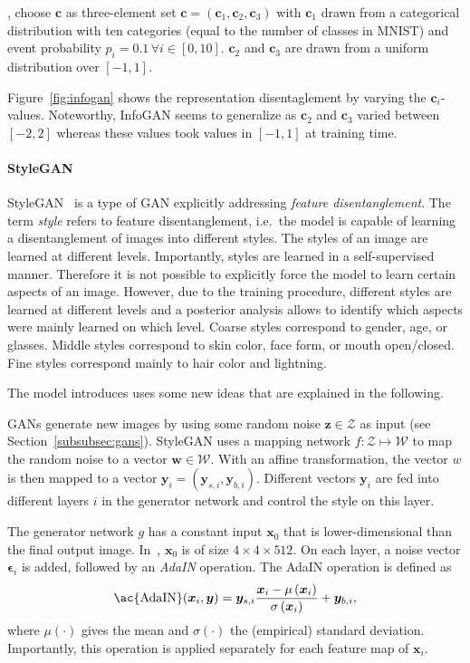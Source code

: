 , \citet{chen2016infogan} choose $\bm{c}$ as three-element set $\bm{c} = (\bm{c}_1, \bm{c}_2, \bm{c}_3)$ with $\bm{c}_1$ drawn from a categorical distribution with ten categories (equal to the number of classes in MNIST) and event probability $p_i=0.1 \, \forall i \in [0, 10]$.
$\bm{c}_2$ and $\bm{c}_3$ are drawn from a uniform distribution over $[-1, 1]$.

Figure~\ref{fig:infogan} shows the representation disentaglement by varying the $\bm{c}_i$-values.
Noteworthy, InfoGAN seems to generalize as $\bm{c}_2$ and $\bm{c}_3$ varied between $[-2, 2]$ whereas these values took values in $[-1, 1]$ at training time.

\paragraph{StyleGAN}
StyleGAN~\citep{karras2019style} is a type of \ac{GAN} explicitly addressing \textit{feature disentanglement}.
The term \textit{style} refers to feature disentanglement, i.e.~the model is capable of learning a disentanglement of images into different styles.
The styles of an image are learned at different levels.
Importantly, styles are learned in a self-supervised manner.
Therefore it is not possible to explicitly force the model to learn certain aspects of an image.
However, due to the training procedure, different styles are learned at different levels and a posterior analysis allows to identify which aspects were mainly learned on which level.
Coarse styles correspond to gender, age, or glasses.
Middle styles correspond to skin color, face form, or mouth open/closed.
Fine styles correspond mainly to hair color and lightning.

The model introduces uses some new ideas that are explained in the following.

\acp{GAN} generate new images by using some random noise $\bm{z}\in \mathcal{Z}$ as input (see Section~\ref{subsubsec:gans}).
StyleGAN uses a mapping network $f: \mathcal{Z}\mapsto \mathcal{W}$ to map the random noise to a vector $\bm{w}\in \mathcal{W}$.
With an affine transformation, the vector $w$ is then mapped to a vector $\bm{y}_i = (\bm{y}_{s,i}, \bm{y}_{b,i})$.
Different vectors $\bm{y}_i$ are fed into different layers $i$ in the generator network and control the style on this layer.

The generator network $g$ has a constant input $\bm{x}_0$ that is lower-dimensional than the final output image.
In~\citet{karras2019style}, $\bm{x}_0$ is of size $4\times 4\times 512$.
On each layer, a noise vector $\bm{\epsilon}_i$ is added, followed by an \textit{\acf{AdaIN}} operation.
The \ac{AdaIN} operation is defined as
\begin{align}
    \text{\ac{AdaIN}}(\bm{x}_i, \bm{y}) = \bm{y}_{s, i} \frac{\bm{x}_{i}-\mu\left(\bm{x}_{i}\right)}{\sigma\left(\bm{x}_{i}\right)}+\bm{y}_{b, i},
\end{align}
\citep{karras2019style} where $\mu(\cdot)$ gives the mean and $\sigma(\cdot)$ the (empirical) standard deviation.
Importantly, this operation is applied separately for each feature map of $\bm{x}_i$.

